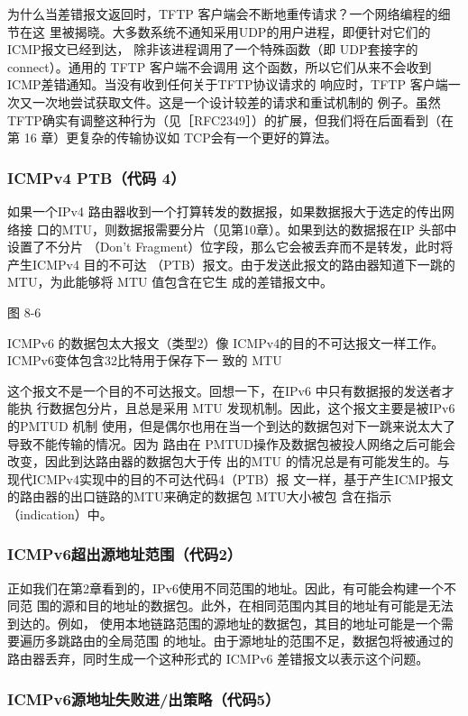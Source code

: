 为什么当差错报文返回时，TFTP 客户端会不断地重传请求？一个网络编程的细节在这
里被揭晓。大多数系统不通知采用UDP的用户进程，即便针对它们的ICMP报文已经到达，
除非该进程调用了一个特殊函数（即 UDP套接字的 connect）。通用的 TFTP 客户端不会调用
这个函数，所以它们从来不会收到ICMP差错通知。当没有收到任何关于TFTP协议请求的
响应时，TFTP 客户端一次又一次地尝试获取文件。这是一个设计较差的请求和重试机制的
例子。虽然 TFTP确实有调整这种行为（见［RFC2349］）的扩展，但我们将在后面看到（在第
16 章）更复杂的传输协议如 TCP会有一个更好的算法。

\subsubsection{ICMPv4 PTB（代码 4）}
如果一个IPv4 路由器收到一个打算转发的数据报，如果数据报大于选定的传出网络接
口的MTU，则数据报需要分片（见第10章）。如果到达的数据报在IP 头部中设置了不分片
（Don't Fragment）位字段，那么它会被丢弃而不是转发，此时将产生ICMPv4 目的不可达
（PTB）报文。由于发送此报文的路由器知道下一跳的MTU，为此能够将 MTU 值包含在它生
成的差错报文中。

图 8-6

ICMPv6 的数据包太大报文（类型2）像
ICMPv4的目的不可达报文一样工作。
ICMPv6变体包含32比特用于保存下一
致的 MTU


这个报文不是一个目的不可达报文。回想一下，在IPv6 中只有数据报的发送者才能执
行数据包分片，且总是采用 MTU 发现机制。因此，这个报文主要是被IPv6 的PMTUD 机制
使用，但是偶尔也用在当一个到达的数据包对下一跳来说太大了导致不能传输的情况。因为
路由在 PMTUD操作及数据包被投人网络之后可能会改变，因此到达路由器的数据包大于传
出的MTU 的情况总是有可能发生的。与现代ICMPv4实现中的目的不可达代码4（PTB）报
文一样，基于产生ICMP报文的路由器的出口链路的MTU来确定的数据包 MTU大小被包
含在指示（indication）中。

\subsubsection{ICMPv6超出源地址范围（代码2）}
正如我们在第2章看到的，IPv6使用不同范围的地址。因此，有可能会构建一个不同范
围的源和目的地址的数据包。此外，在相同范围内其目的地址有可能是无法到达的。例如，
使用本地链路范围的源地址的数据包，其目的地址可能是一个需要遍历多跳路由的全局范围
的地址。由于源地址的范围不足，数据包将被通过的路由器丢弃，同时生成一个这种形式的
ICMPv6 差错报文以表示这个问题。

\subsubsection{ICMPv6源地址失败进/出策略（代码5）}


